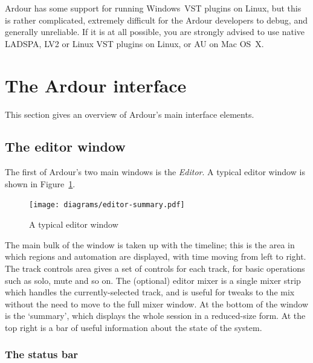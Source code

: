 \documentclass[10pt,a4paper]{book}
\begin{document}
Ardour has some support for running Windows~VST plugins on Linux, but
this is rather complicated, extremely difficult for the Ardour
developers to debug, and generally unreliable.  If it is at all
possible, you are strongly advised to use native LADSPA, LV2 or Linux
VST plugins on Linux, or AU on Mac OS~X\@.


\section{The Ardour interface}

This section gives an overview of Ardour's main interface elements.

\subsection{The editor window}

The first of Ardour's two main windows is the \emph{Editor}.  A
typical editor window is shown in Figure~\ref{fig:typical-editor}.

\begin{figure}[ht]
\begin{center}
\texttt{[image: diagrams/editor-summary.pdf]}
\end{center}
\caption{A typical editor window}
\label{fig:typical-editor}
\end{figure}

The main bulk of the window is taken up with the timeline; this is the
area in which regions and automation are displayed, with time moving
from left to right.  The track controls area gives a set of controls
for each track, for basic operations such as solo, mute and so on.
The (optional) editor mixer is a single mixer strip which handles the
currently-selected track, and is useful for tweaks to the mix without
the need to move to the full mixer window.  At the bottom of the
window is the `summary', which displays the whole session in a
reduced-size form.  At the top right is a bar of useful information
about the state of the system.

\subsubsection{The status bar}
\end{document}
